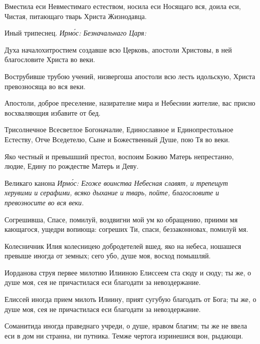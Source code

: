 Вместила еси Невместимаго естеством, носила еси Носящаго вся, доила еси, Чистая, питающаго тварь Христа Жизнодавца.

Иный трипеснец. \itshape Ирм\'{о}с\normalfont{}: Безначальнаго Царя:


Духа началохитростием создавше всю Церковь, апостоли Христовы, в ней благословите Христа во веки.


Вострубивше трубою учений, низвергоша апостоли всю лесть идольскую, Христа превозносяща во вся веки.


Апостоли, доброе преселение, назирателие мира и Небеснии жителие, вас присно восхваляющия избавите от бед.


Трисолнечное Всесветлое Богоначалие, Единославное и Единопрестольное Естеству, Отче Вседетелю, Сыне и Божественный Душе, пою Тя во веки.


Яко честный и превышший престол, воспоим Божию Матерь непрестанно, людие, Едину по рождестве Матерь и Деву.

Великаго канона \itshape Ирм\'{о}с\normalfont{}: Егоже воинства Небесная славят, и трепещут херувими и серафими, всяко дыхание и тварь, пойте, благословите и превозносите во вся веки.

Согрешивша, Спасе, помилуй, воздвигни мой ум ко обращению, приими мя кающагося, ущедри вопиюща: согреших Ти, спаси, беззаконновах, помилуй мя.

Колесничник Илия колесницею добродетелей вшед, яко на небеса, ношашеся превыше иногда от земных; сего убо, душе моя, восход помышляй.

Иорданова струя первее милотию Илииною Елиссеем ста сюду и сюду; ты же, о душе моя, сея не причастилася еси благодати за невоздержание.

Елиссей иногда прием милоть Илиину, прият сугубую благодать от Бога; ты же, о душе моя, сея не причастилася еси благодати за невоздержание.

Соманитида иногда праведнаго учреди, о душе, нравом благим; ты же не ввела еси в дом ни странна, ни путника. Темже чертога изринешися вон, рыдающи.

